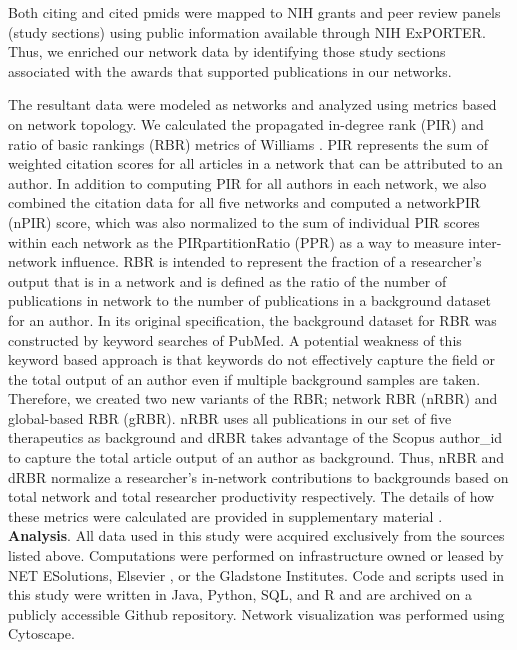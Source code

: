 \documentclass[10pt,letterpaper]{article}
\begin{document}
Both citing and cited pmids were mapped to NIH grants and peer review panels (study sections) using public information available through NIH ExPORTER\cite{bibNIHExPORTER}. Thus, we enriched our network data by identifying those study sections associated with the awards that supported publications in our networks. 

The resultant data were modeled as networks and analyzed using metrics based on network topology. We calculated the propagated in-degree rank (PIR) and ratio of basic rankings (RBR) metrics of Williams \cite {bibWilliams}. PIR represents the sum of weighted citation scores for all articles in a network that can be attributed to an author. In addition to computing PIR for all authors in each network, we also combined the citation data for all five networks and computed a networkPIR (nPIR) score, which was also normalized to the sum of individual PIR scores within each network as the PIRpartitionRatio (PPR) as a way to measure inter-network influence. RBR is intended to represent the fraction of a researcher's output that is in a network and is defined as the ratio of the number of publications in network to the number of publications in a background dataset for an author. In its original specification, the background dataset for RBR was constructed by keyword searches of PubMed. A potential weakness of this keyword based approach is that keywords do not effectively capture the field or the total output of an author even if multiple background samples are taken. Therefore, we created two new variants of the RBR; network RBR (nRBR) and global-based RBR (gRBR). nRBR uses all publications in our set of five therapeutics as background and dRBR takes advantage of the Scopus author\_id to capture the total article output of an author as background. Thus, nRBR and dRBR normalize a researcher's in-network contributions to backgrounds based on total network and total researcher productivity respectively. The details of how these metrics were calculated are provided in supplementary material .\\

\textbf{Analysis}. All data used in this study were acquired exclusively from the sources listed above. Computations were performed on infrastructure owned or leased by NET ESolutions, Elsevier , or the Gladstone Institutes. Code and scripts used in this study were written in Java, Python, SQL, and R and are archived on a publicly accessible Github repository\cite{bibGithub}.  Network visualization was performed using Cytoscape\cite{bibCytoscape}.
\end{document}
